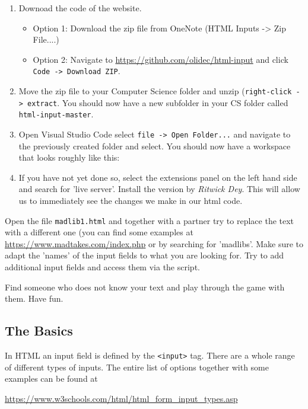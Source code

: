 \documentclass[english,11pt,a4paper]{report}
\begin{document}
\renewcommand{\labelenumi}{\arabic{enumi}.}
\begin{enumerate}
\item Downoad the code of the website.
\begin{itemize}
\item Option 1: Download the zip file from OneNote (HTML Inputs -> Zip File....)
\item Option 2: Navigate to \url{https://github.com/olidec/html-input} and click \verb|Code -> Download ZIP|.
\end{itemize}
\item Move the zip file to your Computer Science folder and unzip (\verb|right-click -> extract|. You should now have a new subfolder in your CS folder called \verb|html-input-master|.
\item Open Visual Studio Code select \verb|file -> Open Folder...| and navigate to the previously created folder and select. You should now have a workspace that looks roughly like this:
\item If you have not yet done so, select the extensions panel on the left hand side and search for 'live server'. Install the version by \emph{Ritwick Dey}. This will allow us to immediately see the changes we make in our html code.
\end{enumerate}

\begin{ex}
Open the file \verb|madlib1.html| and together with a partner try to replace the text with a different one (you can find some examples at \url{https://www.madtakes.com/index.php} or by searching for 'madlibs'.  Make sure to adapt the 'names' of the input fields to what you are looking for. Try to add additional input fields and access them via the script.

Find someone who does not know your text and play through the game with them. Have fun.
\end{ex}


\subsection{The Basics}

In HTML an input field is defined by the \verb|<input>| tag. There are a whole range of different types of inputs. The entire list of options together with some examples can be found at
\begin{center}
\url{https://www.w3schools.com/html/html_form_input_types.asp}
\end{center}
\end{document}
